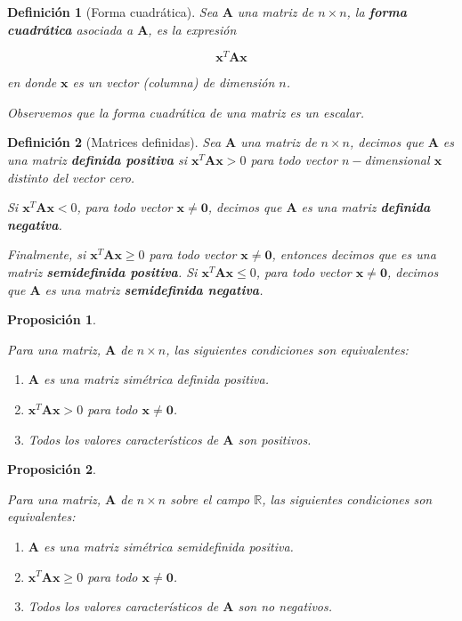 \documentclass[11pt]{report}
\theoremstyle{break}
\newtheorem{definicion}{Definición}[chapter]
\newtheorem{proposicion}{Proposición}[chapter]
\theoremstyle{break}
\newcommand{\mbb}[1]{$\mathbb{#1}$}
\newcommand{\matdim}[2]{$#1 \times #2$}
\begin{document}
\begin{definicion}[Forma cuadrática]
\label{definicion:forma cuadratica}
Sea $\bm{A}$ una matriz de \matdim{n}{n}, la \textbf{forma cuadrática} asociada a $\bm{A}$, es la expresión

$$ \bm{x}^{T} \bm{Ax}$$

en donde $\bm{x}$ es un vector (columna) de dimensión $n$.

Observemos que la forma cuadrática de una matriz es un escalar.
\end{definicion}

\begin{definicion}[Matrices definidas]
\label{definicion:matrices definida}
Sea $\bm{A}$ una matriz de \matdim{n}{n}, decimos que $\bm{A}$ es una matriz \textbf{definida positiva} si $\bm{x}^{T} \bm{Ax} > 0$ para todo vector $n-$dimensional $\bm{x}$ distinto del vector cero.

Si  $\bm{x}^{T} \bm{Ax} < 0$, para todo vector $\bm{x} \neq \bm{0}$, decimos que $\bm{A}$ es una matriz \textbf{definida negativa}.

Finalmente, si $\bm{x}^{T} \bm{Ax} \geq 0$ para todo vector $\bm{x} \neq \bm{0}$, entonces decimos que es una matriz \textbf{semidefinida positiva}. Si $\bm{x}^{T} \bm{Ax} \leq 0$,  para todo vector $\bm{x} \neq \bm{0}$, decimos que $\bm{A}$ es una matriz \textbf{semidefinida negativa}.

\end{definicion}

\begin{proposicion}
\label{proposicion:positivas y eigenvalores}

Para una matriz, $\bm{A}$ de \matdim{n}{n}, las siguientes condiciones son equivalentes:

\begin{enumerate}[label=\alph*) ]
\item $\bm{A}$ es una matriz simétrica definida positiva.
\item $\bm{x}^{T} \bm{Ax} > 0$ para todo $\bm{x} \neq \bm{0}$.
\item Todos los valores característicos de $\bm{A}$ son positivos.
\end{enumerate}
\end{proposicion}

\begin{proposicion}
\label{proposicion:semidefinidas y eigenvalores}

Para una matriz, $\bm{A}$ de \matdim{n}{n} sobre el campo \mbb{R}, las siguientes condiciones son equivalentes:

\begin{enumerate}[label=\alph*) ]
\item $\bm{A}$ es una matriz simétrica semidefinida positiva.
\item $\bm{x}^{T} \bm{Ax} \geq 0$ para todo $\bm{x} \neq \bm{0}$.
\item Todos los valores característicos de $\bm{A}$ son no negativos.
\end{enumerate}
\end{proposicion}
\end{document}
